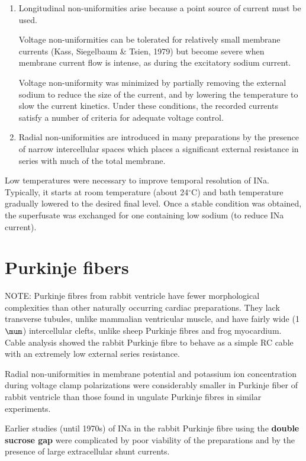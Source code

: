 \begin{enumerate}
  \item Longitudinal non-uniformities arise because a point source of
current must be used. 

Voltage non-uniformities can be tolerated for relatively small membrane
currents (Kass, Siegelbaum \& Tsien, 1979) but become severe when membrane
current flow is intense, as during the excitatory sodium current.

Voltage non-uniformity was minimized by partially removing the external sodium
to reduce the size of the current, and by lowering the temperature to slow the
current kinetics. Under these conditions, the recorded currents satisfy a number
of criteria for adequate voltage control.

  \item Radial non-uniformities are introduced in many preparations by the
  presence of narrow intercellular spaces which places a significant external
  resistance in series with much of the total membrane.
  
\end{enumerate}

Low temperatures were necessary to improve temporal resolution of INa.
Typically, it starts at room temperature (about 24$^\circ$C) and bath
temperature gradually lowered to the desired final level.
Once a stable condition was obtained, the superfusate was exchanged for one
containing low sodium (to reduce INa current). 


\section{Purkinje fibers}

NOTE: Purkinje fibres from rabbit ventricle have fewer morphological
complexities than other naturally occurring cardiac preparations.
They lack transverse tubules, unlike mammalian ventricular muscle, and have
fairly wide (1 $\mum$) intercellular clefts, unlike sheep Purkinje fibres and
frog myocardium. Cable analysis showed the rabbit Purkinje fibre to behave as a
simple RC cable with an extremely low external series resistance.

Radial non-uniformities in membrane potential and potassium
ion concentration during voltage clamp polarizations were considerably smaller
in Purkinje fiber of rabbit ventricle than those found in ungulate Purkinje
fibres in similar experiments.

Earlier studies (until 1970s) of INa in the rabbit Purkinje fibre using the
{\bf double sucrose gap} were complicated by poor viability of the preparations
and by the presence of large extracellular shunt currents.



